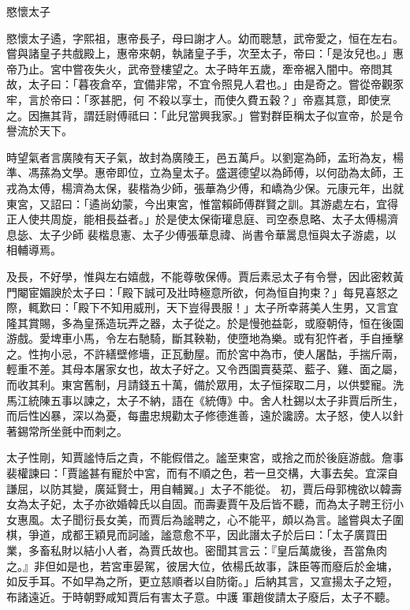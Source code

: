
\begin{pinyinscope}
愍懷太子



 愍懷太子遹，字熙祖，惠帝長子，母曰謝才人。幼而聰慧，武帝愛之，恒在左右。嘗與諸皇子共戲殿上，惠帝來朝，執諸皇子手，次至太子，帝曰：「是汝兒也。」惠帝乃止。宮中嘗夜失火，武帝登樓望之。太子時年五歲，牽帝裾入闇中。帝問其故，太子曰：「暮夜倉卒，宜備非常，不宜令照見人君也。」由是奇之。嘗從帝觀豕牢，言於帝曰：「豕甚肥，何
 不殺以享士，而使久費五穀？」帝嘉其意，即使烹之。因撫其背，謂廷尉傅祗曰：「此兒當興我家。」嘗對群臣稱太子似宣帝，於是令譽流於天下。



 時望氣者言廣陵有天子氣，故封為廣陵王，邑五萬戶。以劉寔為師，孟珩為友，楊準、馮蓀為文學。惠帝即位，立為皇太子。盛選德望以為師傅，以何劭為太師，王戎為太傅，楊濟為太保，裴楷為少師，張華為少傅，和嶠為少保。元康元年，出就東宮，又詔曰：「遹尚幼蒙，今出東宮，惟當賴師傅群賢之訓。其游處左右，宜得正人使共周旋，能相長益者。」於是使太保衛瓘息庭、司空泰息略、太子太傅楊濟息毖、太子少師
 裴楷息憲、太子少傅張華息禕、尚書令華暠息恒與太子游處，以相輔導焉。



 及長，不好學，惟與左右嬉戲，不能尊敬保傅。賈后素忌太子有令譽，因此密敕黃門閹宦媚諛於太子曰：「殿下誠可及壯時極意所欲，何為恒自拘束？」每見喜怒之際，輒歎曰：「殿下不知用威刑，天下豈得畏服！」太子所幸蔣美人生男，又言宜隆其賞賜，多為皇孫造玩弄之器，太子從之。於是慢弛益彰，或廢朝侍，恒在後園游戲。愛埤車小馬，令左右馳騎，斷其鞅勒，使墮地為樂。或有犯忤者，手自捶擊之。性拘小忌，不許繕壁修墻，正瓦動屋。而於宮中為市，使人屠酤，手揣斤兩，
 輕重不差。其母本屠家女也，故太子好之。又令西園賣葵菜、藍子、雞、面之屬，而收其利。東宮舊制，月請錢五十萬，備於眾用，太子恒探取二月，以供嬖寵。洗馬江統陳五事以諫之，太子不納，語在《統傳》中。舍人杜錫以太子非賈后所生，而后性凶暴，深以為憂，每盡忠規勸太子修德進善，遠於讒謗。太子怒，使人以針著錫常所坐氈中而剌之。



 太子性剛，知賈謐恃后之貴，不能假借之。謐至東宮，或捨之而於後庭游戲。詹事裴權諫曰：「賈謐甚有寵於中宮，而有不順之色，若一旦交構，大事去矣。宜深自謙屈，以防其變，廣延賢士，用自輔翼。」太子不能從。
 初，賈后母郭槐欲以韓壽女為太子妃，太子亦欲婚韓氏以自固。而壽妻賈午及后皆不聽，而為太子聘王衍小女惠風。太子聞衍長女美，而賈后為謐聘之，心不能平，頗以為言。謐嘗與太子圍棋，爭道，成都王穎見而訶謐，謐意愈不平，因此譖太子於后曰：「太子廣買田業，多畜私財以結小人者，為賈氏故也。密聞其言云：『皇后萬歲後，吾當魚肉之。』非但如是也，若宮車晏駕，彼居大位，依楊氏故事，誅臣等而廢后於金墉，如反手耳。不如早為之所，更立慈順者以自防衛。」后納其言，又宣揚太子之短，布諸遠近。于時朝野咸知賈后有害太子意。中護
 軍趙俊請太子廢后，太子不聽。




\end{pinyinscope}
